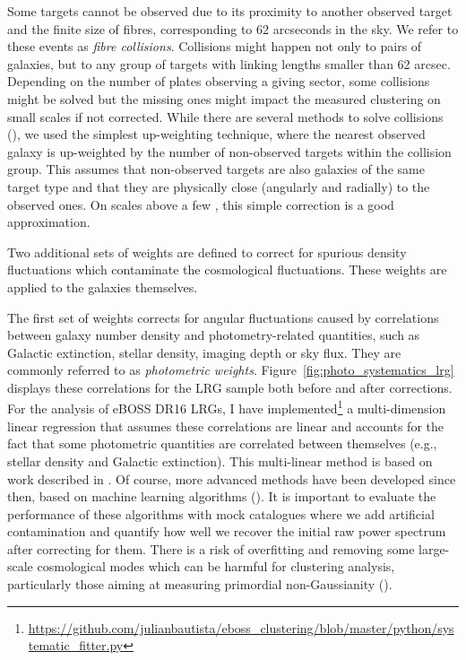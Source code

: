 Some targets cannot be observed due to 
its proximity to another observed target and the finite size of fibres, corresponding 
to 62 arcseconds in the sky. We refer to these events as \emph{fibre collisions}. 
Collisions might happen not only to pairs of galaxies, but to any group of targets with 
linking lengths smaller than 62 arcsec. Depending on the number of plates observing 
a giving sector, some collisions might be solved but the missing ones might 
impact the measured clustering on small scales if not corrected. 
While there are several methods to solve collisions 
(\cite{guoNewMethodCorrect2012, bianchiUnbiasedClusteringEstimation2017}),
we used the simplest up-weighting technique, where the nearest observed galaxy 
is up-weighted by the number of non-observed targets within the collision group. 
This assumes that non-observed targets are also galaxies of the same target type and 
that they are physically close (angularly and radially) to the observed ones.
On scales above a few \hmpc, this simple correction is a good approximation. 

Two additional sets of weights are defined to correct for spurious density 
fluctuations which contaminate the cosmological fluctuations. 
These weights are applied to the galaxies themselves. 

The first set of weights corrects for angular fluctuations caused 
by correlations between galaxy number density and photometry-related quantities,
such as Galactic extinction, stellar density, imaging depth or sky flux.
They are commonly referred to as \emph{photometric weights}. 
Figure~\ref{fig:photo_systematics_lrg} displays these correlations 
for the LRG sample both before and after corrections. 
For the analysis of eBOSS DR16 LRGs, I have 
implemented\footnote{\url{https://github.com/julianbautista/eboss_clustering/blob/master/python/systematic_fitter.py}} 
a multi-dimension 
linear regression that assumes these correlations are linear and 
accounts for the fact that some photometric quantities are correlated between themselves 
(e.g., stellar density and Galactic extinction).
This multi-linear method is based on work described in \cite{prakashSDSSIVExtendedBaryon2016}.
Of course, more advanced methods have been developed since then, based on 
machine learning algorithms 
(\cite{rezaieImprovingGalaxyClustering2020, chaussidonAngularClusteringProperties2021}).
It is important to evaluate the performance of these algorithms with mock catalogues
where we add artificial contamination 
and quantify how well we recover the initial raw power spectrum after correcting for them. 
There is a risk of overfitting and removing some large-scale cosmological modes which 
can be harmful for clustering analysis, particularly those aiming at measuring 
primordial non-Gaussianity 
(\cite{rezaiePrimordialNonGaussianityCompleted2021, muellerClusteringGalaxiesCompleted2021}).

